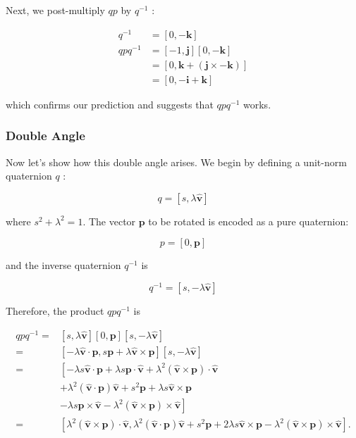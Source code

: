 \documentclass[10pt]{article}
\begin{document}
Next, we post-multiply $q p$ by $q^{-1}$ :

$$
\begin{aligned}
q^{-1} & =[0,-\mathbf{k}] \\
q p q^{-1} & =[-1, \mathbf{j}][0,-\mathbf{k}] \\
& =[0, \mathbf{k}+(\mathbf{j} \times-\mathbf{k})] \\
& =[0,-\mathbf{i}+\mathbf{k}]
\end{aligned}
$$

which confirms our prediction and suggests that $q p q^{-1}$ works.

\subsubsection{Double Angle}
Now let's show how this double angle arises. We begin by defining a unit-norm quaternion $q$ :

$$
q=[s, \lambda \hat{\mathbf{v}}]
$$

where $s^{2}+\lambda^{2}=1$. The vector $\mathbf{p}$ to be rotated is encoded as a pure quaternion:

$$
p=[0, \mathbf{p}]
$$

and the inverse quaternion $q^{-1}$ is

$$
q^{-1}=[s,-\lambda \hat{\mathbf{v}}]
$$

Therefore, the product $q p q^{-1}$ is

$$
\begin{aligned}
q p q^{-1}= & {[s, \lambda \hat{\mathbf{v}}][0, \mathbf{p}][s,-\lambda \hat{\mathbf{v}}] } \\
= & {[-\lambda \hat{\mathbf{v}} \cdot \mathbf{p}, s \mathbf{p}+\lambda \hat{\mathbf{v}} \times \mathbf{p}][s,-\lambda \hat{\mathbf{v}}] } \\
= & {\left[-\lambda s \hat{\mathbf{v}} \cdot \mathbf{p}+\lambda s \mathbf{p} \cdot \hat{\mathbf{v}}+\lambda^{2}(\hat{\mathbf{v}} \times \mathbf{p}) \cdot \hat{\mathbf{v}}\right.} \\
& +\lambda^{2}(\hat{\mathbf{v}} \cdot \mathbf{p}) \hat{\mathbf{v}}+s^{2} \mathbf{p}+\lambda s \hat{\mathbf{v}} \times \mathbf{p} \\
& \left.-\lambda s \mathbf{p} \times \hat{\mathbf{v}}-\lambda^{2}(\hat{\mathbf{v}} \times \mathbf{p}) \times \hat{\mathbf{v}}\right] \\
= & {\left[\lambda^{2}(\hat{\mathbf{v}} \times \mathbf{p}) \cdot \hat{\mathbf{v}}, \lambda^{2}(\hat{\mathbf{v}} \cdot \mathbf{p}) \hat{\mathbf{v}}+s^{2} \mathbf{p}+2 \lambda s \hat{\mathbf{v}} \times \mathbf{p}-\lambda^{2}(\hat{\mathbf{v}} \times \mathbf{p}) \times \hat{\mathbf{v}}\right] . }
\end{aligned}
$$
\end{document}
